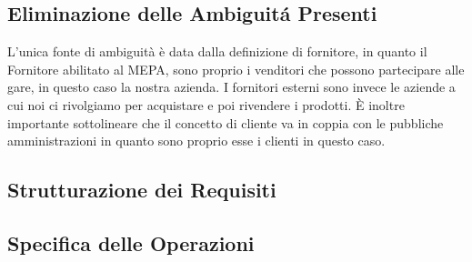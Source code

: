 \documentclass[12pt]{article} %
\begin{document}
		\subsection{Eliminazione delle Ambiguit\'{a} Presenti}

		L'unica fonte di ambiguità è data dalla definizione di fornitore, in quanto il Fornitore abilitato al MEPA, sono proprio i venditori che possono partecipare alle gare, in questo caso la nostra azienda. I fornitori esterni sono invece le aziende a cui noi ci rivolgiamo per acquistare e poi rivendere i prodotti. È inoltre importante sottolineare che il concetto di cliente va in coppia con le pubbliche amministrazioni in quanto sono proprio esse i clienti in questo caso.

		\subsection{Strutturazione dei Requisiti}

		

		\subsection{Specifica delle Operazioni}

		
\end{document}
